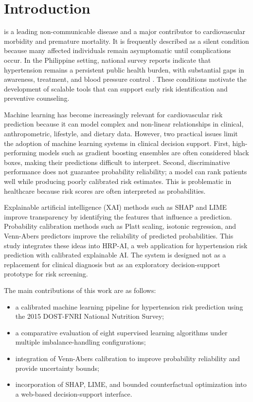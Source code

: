 \documentclass[journal]{IEEEtran}
\begin{document}
\section{Introduction}
 is a leading non-communicable disease and a major contributor to cardiovascular morbidity and premature mortality. It is frequently described as a silent condition because many affected individuals remain asymptomatic until complications occur. In the Philippine setting, national survey reports indicate that hypertension remains a persistent public health burden, with substantial gaps in awareness, treatment, and blood pressure control \cite{ona2021executive}. These conditions motivate the development of scalable tools that can support early risk identification and preventive counseling.

Machine learning has become increasingly relevant for cardiovascular risk prediction because it can model complex and non-linear relationships in clinical, anthropometric, lifestyle, and dietary data. However, two practical issues limit the adoption of machine learning systems in clinical decision support. First, high-performing models such as gradient boosting ensembles are often considered black boxes, making their predictions difficult to interpret. Second, discriminative performance does not guarantee probability reliability; a model can rank patients well while producing poorly calibrated risk estimates. This is problematic in healthcare because risk scores are often interpreted as probabilities.

Explainable artificial intelligence (XAI) methods such as SHAP and LIME improve transparency by identifying the features that influence a prediction. Probability calibration methods such as Platt scaling, isotonic regression, and Venn-Abers predictors improve the reliability of predicted probabilities. This study integrates these ideas into HRP-AI, a web application for hypertension risk prediction with calibrated explainable AI. The system is designed not as a replacement for clinical diagnosis but as an exploratory decision-support prototype for risk screening.

The main contributions of this work are as follows:
\begin{itemize}
    \item a calibrated machine learning pipeline for hypertension risk prediction using the 2015 DOST-FNRI National Nutrition Survey;
    \item a comparative evaluation of eight supervised learning algorithms under multiple imbalance-handling configurations;
    \item integration of Venn-Abers calibration to improve probability reliability and provide uncertainty bounds;
    \item incorporation of SHAP, LIME, and bounded counterfactual optimization into a web-based decision-support interface.
\end{itemize}
\end{document}

